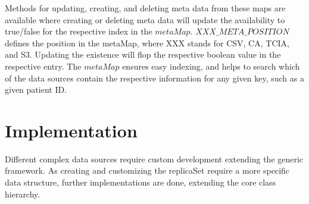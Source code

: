 \documentclass[conference]{IEEEtran}
\begin{document}
Methods for updating, creating, and deleting meta data from these maps are available where creating or deleting meta data will update the availability to true/false for the respective index in the $metaMap$. $XXX\_META\_POSITION$ defines the position in the metaMap, where XXX stands for CSV, CA, TCIA, and S3. Updating the existence will flop the respective boolean value in the respective entry. The $metaMap$ ensures easy indexing, and helps to search which of the data sources contain the respective information for any given key, such as a given patient ID.

\section{Implementation}
Different complex data sources require custom development extending the generic framework. As creating and customizing the replicaSet require a more specific data structure, further implementations are done, extending the core class hierarchy. 
\end{document}
